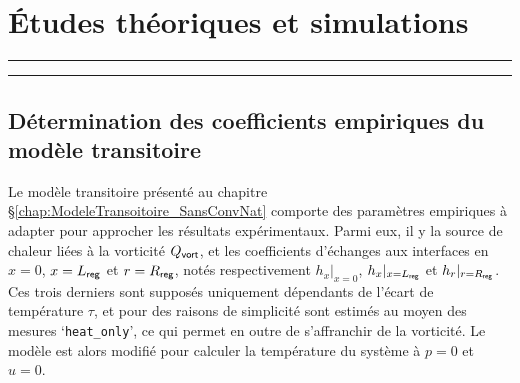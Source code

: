 \chapter{\'Etudes théoriques et simulations}
\vfill
\hrule \vspace{.5cm}
{\hypersetup{linkcolor = black}
\localtableofcontents
}%
\vspace{.5cm} \hrule
\vfill
\clearpage

\section{Détermination des coefficients empiriques du modèle transitoire}

Le modèle transitoire présenté au chapitre §\ref{chap:ModeleTransoitoire_SansConvNat} comporte des paramètres empiriques à adapter pour approcher les résultats expérimentaux. Parmi eux, il y la source de chaleur liées à la vorticité $Q_{\sf vort}$, et les coefficients d'échanges aux interfaces en $x=0$, $x=L_{\sf reg}$ et $r=R_{\sf reg}$, notés respectivement $h_{x}|_{x=0}$, $h_{x}|_{x=L_{\sf reg}}$ et $h_{r}|_{r=R_{\sf reg}}$. Ces trois derniers sont supposés uniquement dépendants de l'écart de température $\tau$, et pour des raisons de simplicité sont estimés au moyen des mesures `\texttt{heat\_only}', ce qui permet en outre de s'affranchir de la vorticité. Le modèle est alors modifié pour calculer la température du système à $p=0$ et $u=0$.